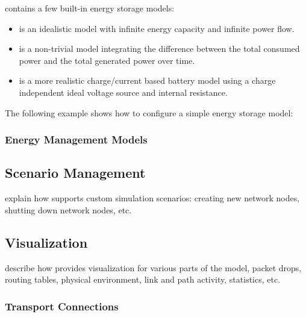 \inet contains a few built-in energy storage models:

\begin{itemize}
        \item {} is an idealistic model with infinite energy capacity and infinite power flow.
        \item {} is a non-trivial model integrating the difference between the total consumed power and the total generated power over time.
        \item {} is a more realistic charge/current based battery model using a charge independent ideal voltage source and internal resistance.
\end{itemize}

The following example shows how to configure a simple energy storage model:


\subsubsection*{Energy Management Models}



\subsection{Scenario Management}
\label{subsec:scenario-management}
%
explain how \inet supports custom simulation scenarios: creating new network nodes, shutting down network nodes, etc.

%
\subsection{Visualization}
\label{subsec:visualization}
%
describe how \inet provides visualization for various parts of the model, packet drops, routing tables, physical environment, link and path activity, statistics, etc.

%
\subsubsection*{Transport Connections}
%

